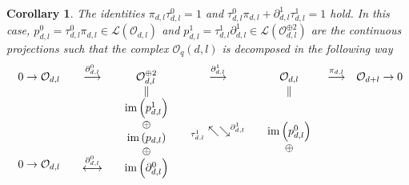 \documentclass[12pt,reqno]{amsart}%
\theoremstyle{plain}
\newtheorem{corollary}{Corollary}
\numberwithin{theorem}{section} \numberwithin{equation}{section}
\numberwithin{lemma}{section}
\numberwithin{remark}{section}
\numberwithin{example}{section}
\numberwithin{proposition}{section}
\numberwithin{definition}{section}
\numberwithin{corollary}{section}
\begin{document}
\begin{corollary}
\label{corDecom}The identities $\pi_{d,l}\tau_{d,l}^{0}=1$ and $\tau_{d,l}%
^{0}\pi_{d,l}+\partial_{d,l}^{1}\tau_{d,l}^{1}=1$ hold. In this case,
$p_{d,l}^{0}=\tau_{d,l}^{0}\pi_{d,l}\in\mathcal{L}\left(  \mathcal{O}%
_{d,l}\right)  $ and $p_{d,l}^{1}=\tau_{d,l}^{1}\partial_{d,l}^{1}%
\in\mathcal{L}\left(  \mathcal{O}_{d,l}^{\oplus2}\right)  $ are the continuous
projections such that the complex $\mathcal{O}_{q}\left(  d,l\right)  $ is
decomposed in the following way
\[%
\begin{array}
[c]{ccccccc}%
0\rightarrow\mathcal{O}_{d,l} & \overset{\partial_{d,l}^{0}}{\longrightarrow}
& \mathcal{O}_{d,l}^{\oplus2} & \overset{\partial_{d,l}^{1}}{\longrightarrow}
& \mathcal{O}_{d,l} & \overset{\pi_{d,l}}{\longrightarrow} & \mathcal{O}%
_{d+l}\rightarrow0\\
&  & \parallel &  & \parallel &  & \\%
\begin{array}
[c]{c}%
\\
\\
\\
\\
0\rightarrow\mathcal{O}_{d,l}%
\end{array}
&
\begin{array}
[c]{c}%
\\
\\
\\
\\
\overset{\partial_{d,l}^{0}}{\longleftrightarrow}%
\end{array}
&
\begin{array}
[c]{c}%
\operatorname{im}\left(  p_{d,l}^{1}\right) \\
\oplus\\
\operatorname{im}\left(  p_{d,l}\right) \\
\oplus\\
\operatorname{im}\left(  \partial_{d,l}^{0}\right)
\end{array}
&
\begin{array}
[c]{c}%
\\
_{\tau_{d,l}^{1}}\nwarrow\searrow^{\partial_{d,l}^{1}}\\
\\
\\
\end{array}
&
\begin{array}
[c]{c}%
\operatorname{im}\left(  p_{d,l}^{0}\right) \\
\oplus\\

\end{array}
\end{array}\]
\end{corollary}
\end{document}
